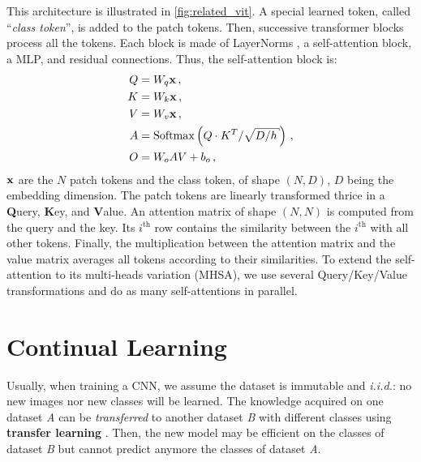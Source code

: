 This architecture is illustrated in \autoref{fig:related_vit}. A special learned token, called
``\textit{class token}'', is added to the patch tokens. Then, successive transformer blocks process
all the tokens. Each block is made of LayerNorms \citep{ba2016layernorm}, a self-attention block, a
\ac{MLP}, and residual connections. Thus, the self-attention block is:
%
\begin{equation}
      \begin{aligned}
            Q & =W_{q} \vx\,,                                                       \\
            K & =W_{k} \vx\,,                                                       \\
            V & =W_{v} \vx\,,                                                       \\
            A & =\operatorname{Softmax}\left(Q \cdot K^{T} / \sqrt{D / h}\right)\,, \\
            O & = W_{o} A V+b_{o}\,,
      \end{aligned}
      \label{sec:related_sa}
\end{equation}
%
\noindent $\mathbf{x}$ are the $N$ patch tokens and the class token, of shape $(N, D)$, $D$ being the
embedding dimension. The patch tokens are linearly transformed thrice in a \textbf{Q}uery,
\textbf{K}ey, and \textbf{V}alue. An attention matrix of shape $(N, N)$ is computed from the query
and the key. Its $i^{\text{th}}$ row contains the similarity between the $i^{\text{th}}$ with all
other tokens. Finally, the multiplication between the attention matrix and the value matrix averages
all tokens according to their similarities. To extend the self-attention to its multi-heads
variation (\ac{MHSA}), we use several Query/Key/Value transformations and do as many self-attentions
in parallel.

\section{Continual Learning}
\label{sec:related_continual}

Usually, when training a \ac{CNN}, we assume the dataset is immutable and \textit{i.i.d.}: no new
images nor new classes will be learned. The knowledge acquired on one dataset \textit{A} can be
\textit{transferred} to another dataset \textit{B} with different classes using \textbf{transfer learning}
\citep{razavian2014transferlearning}. Then, the new model may be efficient on
the classes of dataset \textit{B} but cannot predict anymore the classes of dataset \textit{A}.

